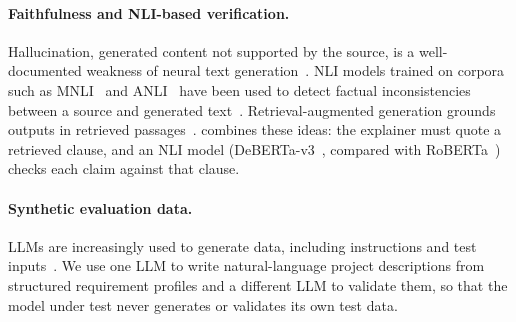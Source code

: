 \paragraph{Faithfulness and NLI-based verification.}
Hallucination, generated content not supported by the source, is a well-documented weakness of neural text generation~\cite{ji2023hallucination,maynez2020faithfulness}. NLI models trained on corpora such as MNLI~\cite{williams2018mnli} and ANLI~\cite{nie2020anli} have been used to detect factual inconsistencies between a source and generated text~\cite{laban2022summac,honovich2022true}. Retrieval-augmented generation grounds outputs in retrieved passages~\cite{lewis2020rag}. \sys{} combines these ideas: the explainer must quote a retrieved clause, and an NLI model (DeBERTa-v3~\cite{he2023debertav3}, compared with RoBERTa~\cite{liu2019roberta}) checks each claim against that clause.

\paragraph{Synthetic evaluation data.}
LLMs are increasingly used to generate data, including instructions and test inputs~\cite{wang2023selfinstruct}. We use one LLM to write natural-language project descriptions from structured requirement profiles and a different LLM to validate them, so that the model under test never generates or validates its own test data.
